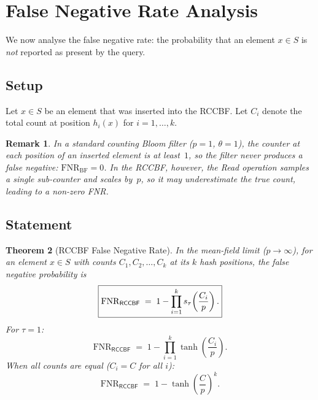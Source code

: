 \documentclass[11pt,a4paper]{article}
\newtheorem{theorem}{Theorem}[section]
\newtheorem{remark}[theorem]{Remark}
\newcommand{\RCCBF}{\textsf{RCCBF}}
\newcommand{\FNR}{\mathrm{FNR}}
\begin{document}
\section{False Negative Rate Analysis}\label{sec:fnr}

We now analyse the false negative rate: the probability that an element
$x \in S$ is \emph{not} reported as present by the query.

\subsection{Setup}\label{ssec:fnr-setup}

Let $x \in S$ be an element that was inserted into the \RCCBF{}.
Let $C_i$ denote the total count at position $h_i(x)$ for $i = 1, \ldots, k$.

\begin{remark}\label{rem:fnr-cbf}
In a standard counting Bloom filter ($p = 1$, $\theta = 1$), the counter
at each position of an inserted element is at least~$1$, so the filter
\emph{never} produces a false negative: $\FNR_{\mathrm{BF}} = 0$.
In the \RCCBF{}, however, the Read operation samples a single
sub-counter and scales by~$p$, so it may underestimate the true count,
leading to a non-zero FNR.
\end{remark}

\subsection{Statement}\label{ssec:fnr-statement}

\begin{theorem}[RCCBF False Negative Rate]\label{thm:fnr-rccbf}
In the mean-field limit ($p \to \infty$), for an element $x \in S$ with
counts $C_1, C_2, \ldots, C_k$ at its $k$ hash positions, the false
negative probability is
\begin{equation}\label{eq:fnr-rccbf}
  \boxed{%
  \FNR_{\RCCBF}
  \;=\; 1 - \prod_{i=1}^{k} s_\tau\!\left(\frac{C_i}{p}\right).}
\end{equation}
For $\tau = 1$:
\begin{equation}\label{eq:fnr-tau1}
  \FNR_{\RCCBF}
  \;=\; 1 - \prod_{i=1}^{k} \tanh\!\left(\frac{C_i}{p}\right).
\end{equation}
When all counts are equal ($C_i = C$ for all $i$):
\begin{equation}\label{eq:fnr-equal}
  \FNR_{\RCCBF}
  \;=\; 1 - \tanh\!\left(\frac{C}{p}\right)^{k}.
\end{equation}
\end{theorem}
\end{document}
